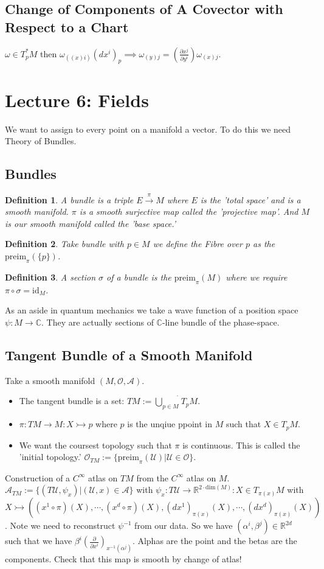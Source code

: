 \documentclass[10pt, oneside]{article}
\newcommand{\R}{\mathbb{R}}
\newcommand{\C}{\mathbb{C}}
\newtheorem{defn}{Definition}
\begin{document}
  \subsection{Change of Components of A Covector with Respect to a Chart}
  $\omega \in T_p^* M$ then $\omega_{((x)i)} (dx^i)_p \implies \omega_{(y)j}= (\frac{\partial x^j}{\partial y^i}) \omega_{(x)j}$.
\section{Lecture 6: Fields \cite{Fields}}
  We want to assign to every point on a manifold a vector. To do this we need Theory of Bundles.
  \subsection{Bundles}
  \begin{defn}
     A bundle is a triple $E \xrightarrow{\pi} M$ where $E$ is the 'total space' and is a smooth manifold. $\pi$ is a smooth surjective map called the 'projective map'. And $M$ is our smooth manifold called the 'base space.'
  \end{defn}
  \begin{defn}
     Take bundle with $p \in M$ we define the Fibre over $p$ as the $\text{preim}_{\pi} (\{p\})$.
  \end{defn}
  \begin{defn}
     A section $\sigma$ of a bundle is the $\text{preim}_{\pi}(M)$ where we require $\pi \circ \sigma = \text{id}_{M}$.
  \end{defn}
  As an aside in quantum mechanics we take a wave function of a position space $\psi: M \to \C$. They are actually sections of $\C$-line bundle of the phase-space.
  \subsection{Tangent Bundle of a Smooth Manifold}
  Take a smooth manifold $(M,\mathcal{O},\mathcal{A})$.
  \begin{itemize}
     \item The tangent bundle is a set: $TM := \dot{\bigcup_{p \in M}} T_p M$.
     \item $\pi: T M \to M: X \rightarrowtail p$ where $p$ is the unqiue ppoint in $M$ such that $X \in T_p M$.
     \item We want the coursest topology such that $\pi$ is continuous. This is called the 'initial topology.' $\mathcal{O}_{T M}:= \{\text{preim}_{\pi} (\mathcal{U})| \mathcal{U} \in \mathcal{O} \}$. 
  \end{itemize}
  Construction of a $C^\infty$ atlas on $T M$ from the $C^\infty$ atlas on $M$. $\mathcal{A}_{T M} := \{ (T\mathcal{U},\psi_x) | (\mathcal{U},x) \in \mathcal{A} \}$ with $\psi_x: T \mathcal{U} \rightarrow \R^{2\cdot \text{dim}(M)}: X \in T_{\pi (x)} M$ with $X \rightarrowtail ((x^1 \circ \pi)(X),\cdots,(x^d \circ \pi)(X),(dx^1)_{\pi(x)}(X), \cdots, (dx^d)_{\pi (x)}(X))$.
  Note we need to reconstruct $\psi^{-1}$ from our data. So we have $(\alpha^i,\beta^j)\in \R^{2d}$ such that we have $\beta^i (\frac{\partial}{\partial x^i})_{x^{-1}(\alpha^j)}$. Alphas are the point and the betas are the components.
  Check that this map is smooth by change of atlas!
\end{document}

